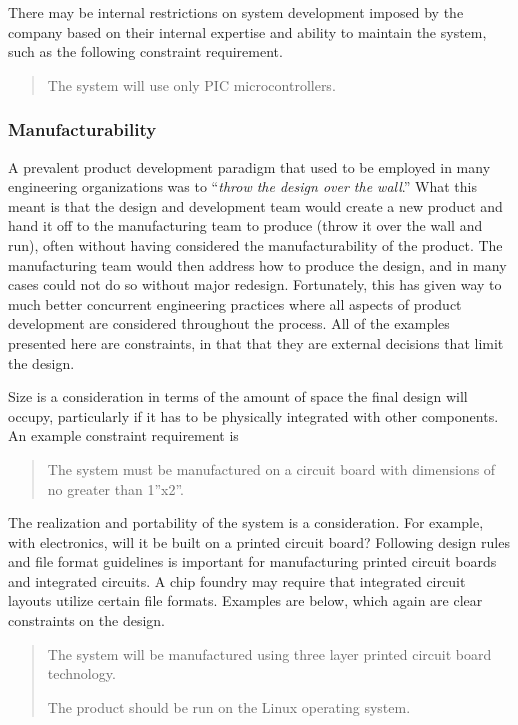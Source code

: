 There may be internal restrictions on system development imposed by the
company based on their internal expertise and ability to maintain the
system, such as the following constraint requirement.

\begin{quote}
The system will use only PIC microcontrollers.
\end{quote}

\subsubsection*{Manufacturability}\label{manufacturability}

A prevalent product development paradigm that used to be employed in
many engineering organizations was to ``\emph{throw the design over the
wall}.'' What this meant is that the design and development team would
create a new product and hand it off to the manufacturing team to
produce (throw it over the wall and run), often without having
considered the manufacturability of the product. The manufacturing team
would then address how to produce the design, and in many cases could
not do so without major redesign. Fortunately, this has given way to
much better concurrent engineering practices where all aspects of
product development are considered throughout the process. All of the
examples presented here are constraints, in that that they are external
decisions that limit the design.

Size is a consideration in terms of the amount of space the final design
will occupy, particularly if it has to be physically integrated with
other components. An example constraint requirement is

\begin{quote}
The system must be manufactured on a circuit board with dimensions of no
greater than 1''x2''.
\end{quote}

The realization and portability of the system is a consideration. For
example, with electronics, will it be built on a printed circuit board?
Following design rules and file format guidelines is important for
manufacturing printed circuit boards and integrated circuits. A chip
foundry may require that integrated circuit layouts utilize certain file
formats. Examples are below, which again are clear constraints on the
design.

\begin{quote}
The system will be manufactured using three layer printed circuit board
technology.

The product should be run on the Linux operating system.
\end{quote}

